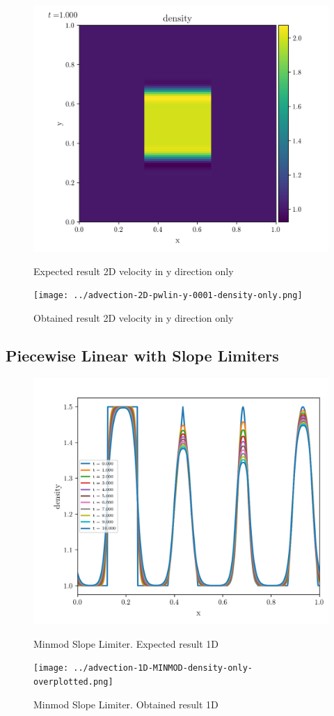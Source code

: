    \begin{figure}[htbp]
        \centering
        \includegraphics[width=.7\textwidth]{./figures/advection-2D-pwlin-y-0001-density-only.png}%
        \caption{Expected result 2D velocity in y direction only}
        \texttt{[image: ../advection-2D-pwlin-y-0001-density-only.png]}%
        \caption{Obtained result 2D velocity in y direction only}
    \end{figure}








\clearpage
\subsection{Piecewise Linear with Slope Limiters}


    \begin{figure}[htbp]
        \centering
        \includegraphics[width=.7\textwidth]{./figures/advection-1D-MINMOD-density-only-overplotted.png}%
        \caption{Minmod Slope Limiter. Expected result 1D}
        \texttt{[image: ../advection-1D-MINMOD-density-only-overplotted.png]}%
        \caption{Minmod Slope Limiter. Obtained result 1D}
    \end{figure}

